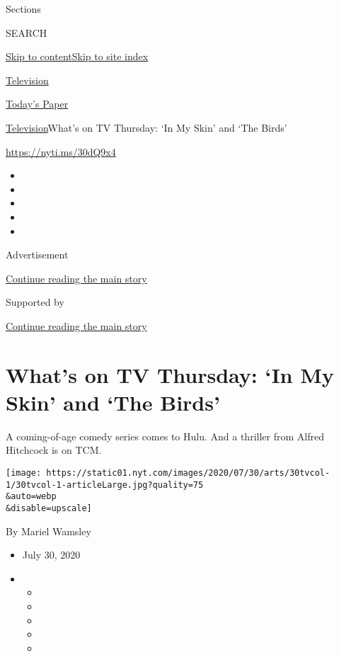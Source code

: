 Sections

SEARCH

\protect\hyperlink{site-content}{Skip to
content}\protect\hyperlink{site-index}{Skip to site index}

\href{https://www.nytimes.com/section/arts/television}{Television}

\href{https://myaccount.nytimes.com/auth/login?response_type=cookie\&client_id=vi}{}

\href{https://www.nytimes.com/section/todayspaper}{Today's Paper}

\href{/section/arts/television}{Television}\textbar{}What's on TV
Thursday: `In My Skin' and `The Birds'

\url{https://nyti.ms/30dQ9x4}

\begin{itemize}
\item
\item
\item
\item
\item
\end{itemize}

Advertisement

\protect\hyperlink{after-top}{Continue reading the main story}

Supported by

\protect\hyperlink{after-sponsor}{Continue reading the main story}

\hypertarget{whats-on-tv-thursday-in-my-skin-and-the-birds}{%
\section{What's on TV Thursday: `In My Skin' and `The
Birds'}\label{whats-on-tv-thursday-in-my-skin-and-the-birds}}

A coming-of-age comedy series comes to Hulu. And a thriller from Alfred
Hitchcock is on TCM.

\texttt{[image: https://static01.nyt.com/images/2020/07/30/arts/30tvcol-1/30tvcol-1-articleLarge.jpg?quality=75\\\&auto=webp\\\&disable=upscale]}

By Mariel Wamsley

\begin{itemize}
\item
  July 30, 2020
\item
  \begin{itemize}
  \item
  \item
  \item
  \item
  \item
  \end{itemize}
\end{itemize}

